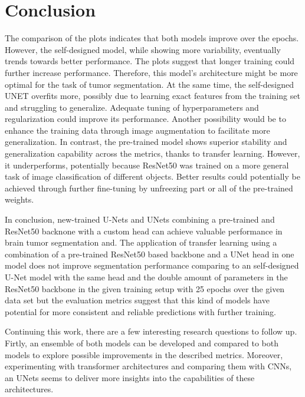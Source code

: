 \documentclass[lettersize,journal]{IEEEtran}
\begin{document}
\section{Conclusion}
The comparison of the plots indicates that both models improve over the epochs. However, the self-designed model, while showing more variability, eventually trends towards better performance. The plots suggest that longer training could further increase performance. Therefore, this model's architecture might be more optimal for the task of tumor segmentation. At the same time, the self-designed UNET overfits more, possibly due to learning exact features from the training set and struggling to generalize. Adequate tuning of hyperparameters and regularization could improve its performance. Another possibility would be to enhance the training data through image augmentation to facilitate more generalization.
In contrast, the pre-trained model shows superior stability and generalization capability across the metrics, thanks to transfer learning. However, it underperforms, potentially because ResNet50 was trained on a more general task of image classification of different objects. Better results could potentially be achieved through further fine-tuning by unfreezing part or all of the pre-trained weights.

In conclusion, new-trained U-Nets and UNets combining a pre-trained and ResNet50 backnone with a custom head can achieve valuable performance in brain tumor segmentation and.
The application of transfer learning using a combination of a pre-trained ResNet50 based backbone and a UNet head in one model does not improve segmentation performance comparing to an self-designed U-Net model with the same head and the double amount of parameters in the ResNet50 backbone in the given training setup with 25 epochs over the given data set but the evaluation metrics suggest that this kind of models have potential for more consistent and reliable predictions with further training.

Continuing this work, there are a few interesting research questions to follow up. Firtly, an ensemble of both models can be developed and compared to both models to explore possible improvements in the described metrics. Moreover, experimenting with transformer architectures and comparing them with CNNs, an UNets seems to deliver more insights into the capabilities of these architectures. 

\balance








\end{document}
